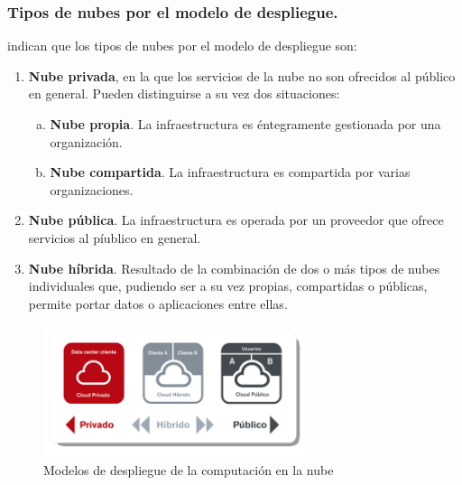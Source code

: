 \subsubsection{Tipos de nubes por el modelo de despliegue.}
\cite{nist} indican que los tipos de nubes por el modelo de despliegue son:
\begin{enumerate}
    \item \textbf{Nube privada}, en  la  que  los  servicios  de la nube no son
          ofrecidos  al  público  en  general. Pueden distinguirse a su vez dos
          situaciones:
          \begin{enumerate}[a.]
              \item \textbf{Nube propia}. La infraestructura es éntegramente gestionada
                    por una organización.
              \item \textbf{Nube compartida}. La  infraestructura  es  compartida  por
                    varias organizaciones.
          \end{enumerate}
    \item \textbf{Nube pública}. La  infraestructura  es  operada  por  un
          proveedor  que  ofrece  servicios al píublico en general.
    \item \textbf{Nube híbrida}. Resultado de la combinación de dos o más tipos de nubes
          individuales que, pudiendo ser a su vez propias, compartidas o públicas,
          permite portar datos o aplicaciones entre ellas.
\end{enumerate}

\begin{figure}[h]
    \centering
    \captionsetup{justification=centering}
    \includegraphics[width=0.7\textwidth]{Imagenes/Bitmap/cloud0}
    \caption{Modelos de despliegue de la computación en la nube}
    \label{fig:cloud1}
\end{figure}

